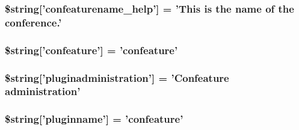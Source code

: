 \hypertarget{confeature_8php_a8fcec121a1eed415031fe7cc62ee41b3}{
\subsubsection[{\$string}]{\setlength{\rightskip}{0pt plus 5cm}\$string\mbox{[}'confeaturename\-\_\-help'\mbox{]} = 'This is the name of the conference.'}}\label{confeature_8php_a8fcec121a1eed415031fe7cc62ee41b3}
\hypertarget{confeature_8php_ac89ec52df1912bc34e00fe4e3479a2d1}{
\subsubsection[{\$string}]{\setlength{\rightskip}{0pt plus 5cm}\$string\mbox{[}'confeature'\mbox{]} = 'confeature'}}\label{confeature_8php_ac89ec52df1912bc34e00fe4e3479a2d1}
\hypertarget{confeature_8php_a4652111b33fd71afcd52207b067bbe5c}{
\subsubsection[{\$string}]{\setlength{\rightskip}{0pt plus 5cm}\$string\mbox{[}'pluginadministration'\mbox{]} = 'Confeature administration'}}\label{confeature_8php_a4652111b33fd71afcd52207b067bbe5c}
\hypertarget{confeature_8php_a6ce7ae846f568c162c9d6d051fdc6885}{
\subsubsection[{\$string}]{\setlength{\rightskip}{0pt plus 5cm}\$string\mbox{[}'pluginname'\mbox{]} = 'confeature'}}\label{confeature_8php_a6ce7ae846f568c162c9d6d051fdc6885}

